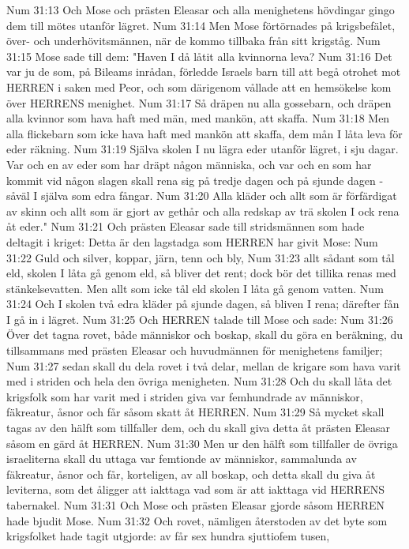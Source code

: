 Num 31:13  Och Mose och prästen Eleasar och alla menighetens hövdingar gingo dem till mötes utanför lägret.
Num 31:14  Men Mose förtörnades på krigsbefälet, över- och underhövitsmännen, när de kommo tillbaka från sitt krigståg.
Num 31:15  Mose sade till dem: "Haven I då låtit alla kvinnorna leva?
Num 31:16  Det var ju de som, på Bileams inrådan, förledde Israels barn till att begå otrohet mot HERREN i saken med Peor, och som därigenom vållade att en hemsökelse kom över HERRENS menighet.
Num 31:17  Så dräpen nu alla gossebarn, och dräpen alla kvinnor som hava haft med män, med mankön, att skaffa.
Num 31:18  Men alla flickebarn som icke hava haft med mankön att skaffa, dem mån I låta leva för eder räkning.
Num 31:19  Själva skolen I nu lägra eder utanför lägret, i sju dagar. Var och en av eder som har dräpt någon människa, och var och en som har kommit vid någon slagen skall rena sig på tredje dagen och på sjunde dagen - såväl I själva som edra fångar.
Num 31:20  Alla kläder och allt som är förfärdigat av skinn och allt som är gjort av gethår och alla redskap av trä skolen I ock rena åt eder."
Num 31:21  Och prästen Eleasar sade till stridsmännen som hade deltagit i kriget: Detta är den lagstadga som HERREN har givit Mose:
Num 31:22  Guld och silver, koppar, järn, tenn och bly,
Num 31:23  allt sådant som tål eld, skolen I låta gå genom eld, så bliver det rent; dock bör det tillika renas med stänkelsevatten. Men allt som icke tål eld skolen I låta gå genom vatten.
Num 31:24  Och I skolen två edra kläder på sjunde dagen, så bliven I rena; därefter fån I gå in i lägret.
Num 31:25  Och HERREN talade till Mose och sade:
Num 31:26  Över det tagna rovet, både människor och boskap, skall du göra en beräkning, du tillsammans med prästen Eleasar och huvudmännen för menighetens familjer;
Num 31:27  sedan skall du dela rovet i två delar, mellan de krigare som hava varit med i striden och hela den övriga menigheten.
Num 31:28  Och du skall låta det krigsfolk som har varit med i striden giva var femhundrade av människor, fäkreatur, åsnor och får såsom skatt åt HERREN.
Num 31:29  Så mycket skall tagas av den hälft som tillfaller dem, och du skall giva detta åt prästen Eleasar såsom en gärd åt HERREN.
Num 31:30  Men ur den hälft som tillfaller de övriga israeliterna skall du uttaga var femtionde av människor, sammalunda av fäkreatur, åsnor och får, korteligen, av all boskap, och detta skall du giva åt leviterna, som det åligger att iakttaga vad som är att iakttaga vid HERRENS tabernakel.
Num 31:31  Och Mose och prästen Eleasar gjorde såsom HERREN hade bjudit Mose.
Num 31:32  Och rovet, nämligen återstoden av det byte som krigsfolket hade tagit utgjorde: av får sex hundra sjuttiofem tusen,
